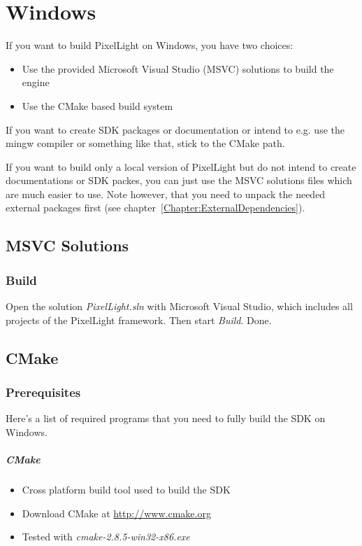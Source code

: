 \chapter{Windows}
If you want to build PixelLight on Windows, you have two choices:
\begin{itemize}
\item{Use the provided Microsoft Visual Studio (MSVC) solutions to build the engine}
\item{Use the CMake based build system}
\end{itemize}

If you want to create SDK packages or documentation or intend to e.g. use the mingw compiler or something like that, stick to the CMake path.

If you want to build only a local version of PixelLight but do not intend to create documentations or SDK packes, you can just use the MSVC solutions files which are much easier to use. Note however, that you need to unpack the needed external packages first (see chapter~\ref{Chapter:ExternalDependencies}).





\section{MSVC Solutions}



\subsection{Build}
Open the solution \emph{PixelLight.sln} with Microsoft Visual Studio, which includes all projects of the PixelLight framework. Then start \emph{Build}. Done.




\section{CMake}



\subsection{Prerequisites}
Here's a list of required programs that you need to fully build the SDK on Windows.


\paragraph{CMake}
\begin{itemize}
\item{Cross platform build tool used to build the SDK}
\item{Download CMake at \url{http://www.cmake.org}}
\item{Tested with \emph{cmake-2.8.5-win32-x86.exe}}
\end{itemize}


